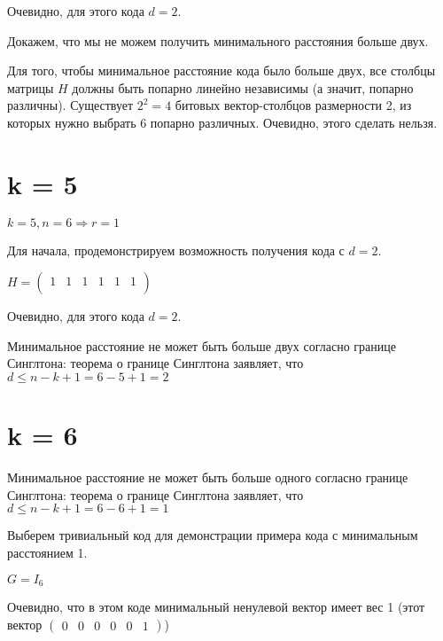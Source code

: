 \documentclass{article}
\begin{document}
	Очевидно, для этого кода $d = 2$. 
	
	Докажем, что мы не можем получить минимального расстояния больше двух.
	
	Для того, чтобы минимальное расстояние кода было больше двух, все столбцы матрицы $H$ должны быть попарно линейно независимы (а значит, попарно различны). Существует $2^2 = 4$ битовых вектор-столбцов размерности 2, из которых нужно выбрать 6 попарно различных. Очевидно, этого сделать нельзя.
	
	\section{k = 5}
	
	$k = 5, n = 6 \Rightarrow r = 1$
	
	Для начала, продемонстрируем возможность получения кода с $d = 2$.
	
	$
	H = \left(
	\begin{array}{cccccc}
	1&1&1&1&1&1\\
	\end{array}
	\right)
	$
	
	Очевидно, для этого кода $d = 2$. 
	
	Минимальное расстояние не может быть больше двух согласно границе Синглтона: теорема о границе Синглтона заявляет, что $d \leq n - k + 1 = 6 - 5 + 1 = 2$
	
	\section{k = 6}
	Минимальное расстояние не может быть больше одного согласно границе Синглтона: теорема о границе Синглтона заявляет, что $d \leq n - k + 1 = 6 - 6+ 1 = 1$
	
	Выберем тривиальный код для демонстрации примера кода с минимальным расстоянием 1.
	
	$
	G = I_6
	$
	
	Очевидно, что в этом коде минимальный ненулевой вектор имеет вес 1 (этот вектор $\left(
	\begin{array}{cccccc}
	0&0&0&0&0&1
	\end{array}
	\right)$)
\end{document}

